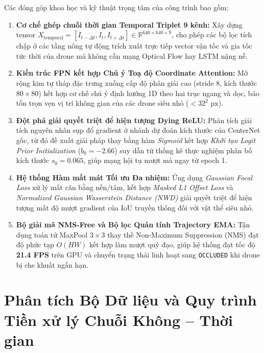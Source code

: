 \documentclass[11pt,a4paper]{article}
\begin{document}
Các đóng góp khoa học và kỹ thuật trọng tâm của công trình bao gồm:
\begin{enumerate}
    \item \textbf{Cơ chế ghép chuỗi thời gian Temporal Triplet 9 kênh:} Xây dựng tensor $X_{\text{temporal}} = [I_{t - \Delta t}, I_t, I_{t + \Delta t}] \in \mathbb{R}^{640 \times 640 \times 9}$, cho phép các bộ lọc tích chập ở các tầng nông tự động trích xuất trực tiếp vector vận tốc và gia tốc tức thời của drone mà không cần mạng Optical Flow hay LSTM nặng nề.
    \item \textbf{Kiến trúc FPN kết hợp Chú ý Toạ độ Coordinate Attention:} Mở rộng kim tự tháp đặc trưng xuống cấp độ phân giải cao (stride 8, kích thước $80 \times 80$) kết hợp cơ chế chú ý định hướng 1D theo hai trục ngang và dọc, bảo tồn trọn vẹn vị trí không gian của các drone siêu nhỏ ($< 32^2\text{ px}$).
    \item \textbf{Đột phá giải quyết triệt để hiện tượng Dying ReLU:} Phân tích giải tích nguyên nhân sụp đổ gradient ở nhánh dự đoán kích thước của CenterNet gốc, từ đó đề xuất giải pháp thay bằng hàm \textit{Sigmoid} kết hợp \textit{Khởi tạo Logit Prior Initialization} ($b_0 = -2.66$) suy dẫn từ thống kê thực nghiệm phân bố kích thước $s_0 = 0.065$, giúp mạng hội tụ mượt mà ngay từ epoch 1.
    \item \textbf{Hệ thống Hàm mất mát Tối ưu Đa nhiệm:} Ứng dụng \textit{Gaussian Focal Loss} xử lý mất cân bằng nền/tâm, kết hợp \textit{Masked L1 Offset Loss} và \textit{Normalized Gaussian Wasserstein Distance (NWD)} giải quyết triệt để hiện tượng mất độ mượt gradient của IoU truyền thống đối với vật thể siêu nhỏ.
    \item \textbf{Bộ giải mã NMS-Free và Bộ lọc Quán tính Trajectory EMA:} Tận dụng toán tử MaxPool $3 \times 3$ thay thế Non-Maximum Suppression (NMS) đạt độ phức tạp $O(HW)$ kết hợp làm mượt quỹ đạo, giúp hệ thống đạt tốc độ \textbf{21.4 FPS} trên GPU và chuyển trạng thái linh hoạt sang \texttt{OCCLUDED} khi drone bị che khuất ngắn hạn.
\end{enumerate}

\section{Phân tích Bộ Dữ liệu và Quy trình Tiền xử lý Chuỗi Không -- Thời gian}
\end{document}
